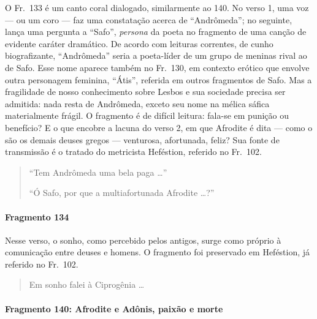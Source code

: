 {\small O Fr.~133 é um canto coral dialogado, similarmente ao 140. No verso 1, uma voz ---
ou um coro --- faz uma constatação acerca de ``Andrômeda”; no seguinte,
lança uma pergunta a ``Safo”, \textit{persona }da poeta no fragmento de
uma canção de evidente caráter dramático. De acordo com leituras correntes, de
cunho biografizante, ``Andrômeda” seria a poeta-líder de um grupo de
meninas rival ao de Safo. Esse nome aparece também no Fr.~130, em contexto
erótico que envolve outra personagem feminina, “Átis”, referida em
outros fragmentos de Safo. Mas a fragilidade de nosso conhecimento sobre Lesbos
e sua sociedade precisa ser admitida: nada resta de Andrômeda, exceto seu nome
na mélica sáfica materialmente frágil. O fragmento é de difícil leitura:
fala-se em punição ou benefício? E o que encobre a lacuna do verso 2, em que
Afrodite é dita --- como o são os demais deuses gregos --- venturosa, afortunada,
feliz? Sua fonte de transmissão é o tratado do metricista Heféstion, referido
no Fr.~102.}

\begin{verse}
“Tem Andrômeda uma bela paga \ldots{}”

“Ó Safo, por que a multiafortunada \qb{}Afrodite \ldots{}?”
\end{verse}

\paragraph{Fragmento 134}

{\small Nesse verso, o sonho, como percebido pelos antigos, surge como próprio à
comunicação entre deuses e homens. O fragmento foi preservado em Heféstion, já
referido no Fr.~102.}

\begin{verse}
Em sonho falei à Ciprogênia \ldots{}
\end{verse}

\paragraph{Fragmento 140: Afrodite e Adônis, paixão e morte}

